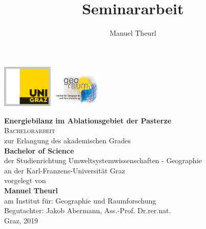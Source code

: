 \documentclass[11pt,a4paper]{article}
\title{Seminararbeit}
\author{Manuel Theurl}
\begin{document}

\begin{titlepage}

\vspace{5cm}


\includegraphics[width=0.18\textwidth]{pictures/logo_uni_graz.jpg}
\hfill
\includegraphics[width=0.18\textwidth]{pictures/logo_geo_raum.jpg}



\begin{center}

\vspace{1.5cm}

\textbf{\Large Energiebilanz im Ablationsgebiet der Pasterze}\\
\vspace{2cm}
\textsc{\Large {Bachelorarbeit}}\\
\vspace{1.5cm}
zur Erlangung des akademischen Grades\\
\vspace{1cm}
\textbf{Bachelor of Science}\\
\vspace{1cm}
der Studienrichtung Umweltsystemwissenschaften - Geographie\\
an der Karl-Franzens-Universität Graz\\
\vspace{1cm}
vorgelegt von\\
\vspace{1cm}
\textbf{Manuel Theurl}\\
\vspace{1cm}
am Institut für: Geographie und Raumforschung\\
\vspace{1cm}
Begutachter: Jakob Abermann, Ass.-Prof. Dr.rer.nat.\\
\vspace{1cm}
Graz, 2019

\end{center}


\end{titlepage} 
\end{document}
